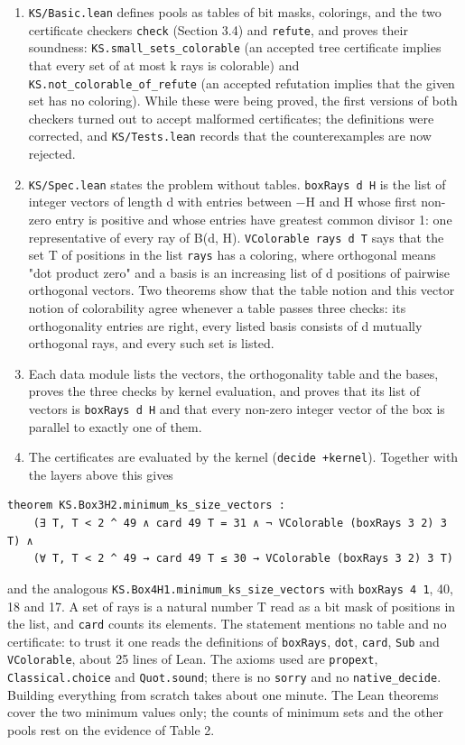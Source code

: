 \documentclass[11pt,a4paper]{article}
\providecommand{\tightlist}{\setlength{\itemsep}{0pt}\setlength{\parskip}{0pt}}
\begin{document}
\begin{enumerate}
\def\labelenumi{\arabic{enumi}.}
\tightlist
\item
  \texttt{KS/Basic.lean} defines pools as tables of bit masks, colorings, and the two certificate checkers
  \texttt{check} (Section 3.4) and \texttt{refute}, and proves their soundness: \texttt{KS.small\_sets\_colorable} (an
  accepted tree certificate implies that every set of at most k rays is colorable) and
  \texttt{KS.not\_colorable\_of\_refute} (an accepted refutation implies that the given set has no coloring).
  While these were being proved, the first versions of both checkers turned out to accept malformed
  certificates; the definitions were corrected, and \texttt{KS/Tests.lean} records that the counterexamples
  are now rejected.
\item
  \texttt{KS/Spec.lean} states the problem without tables. \texttt{boxRays\ d\ H} is the list of integer vectors of
  length d with entries between −H and H whose first non-zero entry is positive and whose entries
  have greatest common divisor 1: one representative of every ray of B(d, H). \texttt{VColorable\ rays\ d\ T}
  says that the set T of positions in the list \texttt{rays} has a coloring, where orthogonal means "dot
  product zero" and a basis is an increasing list of d positions of pairwise orthogonal vectors. Two
  theorems show that the table notion and this vector notion of colorability agree whenever a table
  passes three checks: its orthogonality entries are right, every listed basis consists of d mutually
  orthogonal rays, and every such set is listed.
\item
  Each data module lists the vectors, the orthogonality table and the bases, proves the three checks
  by kernel evaluation, and proves that its list of vectors is \texttt{boxRays\ d\ H} and that every non-zero
  integer vector of the box is parallel to exactly one of them.
\item
  The certificates are evaluated by the kernel (\texttt{decide\ +kernel}). Together with the layers above
  this gives
\end{enumerate}

\begin{verbatim}
theorem KS.Box3H2.minimum_ks_size_vectors :
    (∃ T, T < 2 ^ 49 ∧ card 49 T = 31 ∧ ¬ VColorable (boxRays 3 2) 3 T) ∧
    (∀ T, T < 2 ^ 49 → card 49 T ≤ 30 → VColorable (boxRays 3 2) 3 T)
\end{verbatim}

and the analogous \texttt{KS.Box4H1.minimum\_ks\_size\_vectors} with \texttt{boxRays\ 4\ 1}, 40, 18 and 17. A set of rays
is a natural number T read as a bit mask of positions in the list, and \texttt{card} counts its elements. The
statement mentions no table and no certificate: to trust it one reads the definitions of \texttt{boxRays},
\texttt{dot}, \texttt{card}, \texttt{Sub} and \texttt{VColorable}, about 25 lines of Lean. The axioms used are \texttt{propext},
\texttt{Classical.choice} and \texttt{Quot.sound}; there is no \texttt{sorry} and no \texttt{native\_decide}. Building everything
from scratch takes about one minute. The Lean theorems cover the two minimum values only; the counts
of minimum sets and the other pools rest on the evidence of Table 2.
\end{document}
